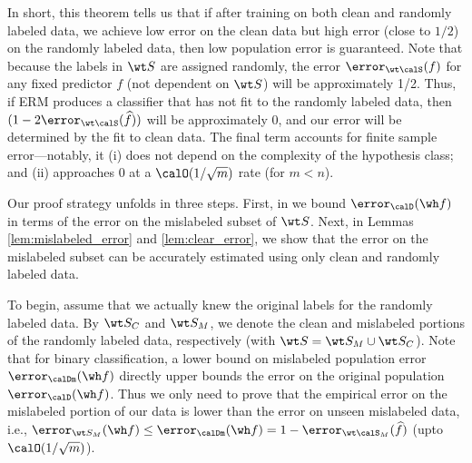 In short, this theorem tells us that 
if after training on both clean and randomly labeled data,
we achieve low error on the clean data
but high error (close to $1/2$) 
on the randomly labeled data,
then low population error is guaranteed.
Note that because the labels in ${\wt S}$
are assigned randomly,
the error $\error_{\wt \calS}(f)$
for any fixed predictor $f$
(not dependent on ${\wt S}$)
will be approximately 1/2. 
Thus, if ERM produces a classifier 
that has not fit to the randomly labeled data,
then $(1 - 2 \error_{\wt \calS} (\widehat f))$ 
will be approximately $0$,
and our error will be determined
by the fit to clean data.
The final term %
accounts for finite sample error---notably,
it (i) does not depend 
on the complexity 
of the hypothesis class;
and (ii) approaches $0$
at a $\calO(1/\sqrt{m})$ rate
(for $m < n$).



Our proof strategy 
unfolds in three steps.
First, in 
we bound $\error_{\calD} (\wh f)$
in terms of the error %
on the mislabeled subset of $\wt S$.
Next, in Lemmas \ref{lem:mislabeled_error} and \ref{lem:clear_error},
we show that the error on the mislabeled subset
can be accurately estimated 
using only clean and randomly labeled data. 


To begin, assume that we actually knew 
the original labels for the randomly labeled data.
By $\wt S_C$ and  $\wt S_M$,
we denote the clean and mislabeled portions
of the randomly labeled data, respectively
(with $\wt S = \wt S_M \cup \wt S_C$).
Note that for binary classification,
a lower bound on %
mislabeled population error $\error_{\calDm}  (\wh f)$
directly upper bounds 
the error on the original population $\error_{\calD}  (\wh f)$.
Thus we only need to prove that 
the empirical error on the mislabeled portion of our data 
is lower than the error on unseen mislabeled data,
i.e., $\error_{\wt S_M} (\wh f) \leq \error_{\calDm}  (\wh f) = 1 - \error_{\wt \calS_M}(\widehat f)$ (upto $\calO(1/\sqrt{m})$).

